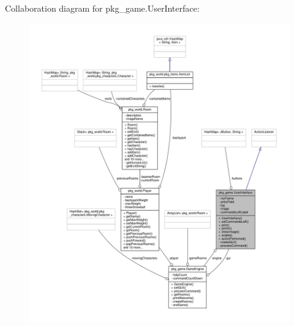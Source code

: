 Collaboration diagram for pkg\-\_\-game.\-User\-Interface\-:
\nopagebreak
\begin{figure}[H]
\begin{center}
\leavevmode
\includegraphics[width=350pt]{classpkg__game_1_1UserInterface__coll__graph}
\end{center}
\end{figure}
